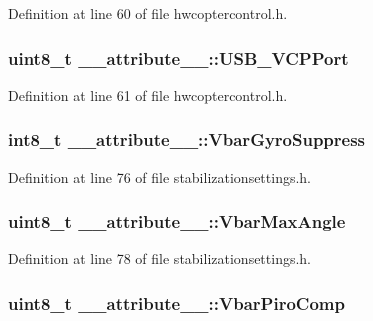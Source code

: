 \-Definition at line 60 of file hwcoptercontrol.\-h.

\hypertarget{struct____attribute_____a2e1a688d4f4b841b7f0a319d7922df49}{
\subsubsection[{\-U\-S\-B\-\_\-\-V\-C\-P\-Port}]{\setlength{\rightskip}{0pt plus 5cm}uint8\-\_\-t {\bf \-\_\-\-\_\-attribute\-\_\-\-\_\-\-::\-U\-S\-B\-\_\-\-V\-C\-P\-Port}}}\label{struct____attribute_____a2e1a688d4f4b841b7f0a319d7922df49}


\-Definition at line 61 of file hwcoptercontrol.\-h.

\hypertarget{struct____attribute_____ab6be6cd99e6b24918e3c84a0bed692b9}{
\subsubsection[{\-Vbar\-Gyro\-Suppress}]{\setlength{\rightskip}{0pt plus 5cm}int8\-\_\-t {\bf \-\_\-\-\_\-attribute\-\_\-\-\_\-\-::\-Vbar\-Gyro\-Suppress}}}\label{struct____attribute_____ab6be6cd99e6b24918e3c84a0bed692b9}


\-Definition at line 76 of file stabilizationsettings.\-h.

\hypertarget{struct____attribute_____a7ddd55c3e30354d5a155bb9f71a3df9f}{
\subsubsection[{\-Vbar\-Max\-Angle}]{\setlength{\rightskip}{0pt plus 5cm}uint8\-\_\-t {\bf \-\_\-\-\_\-attribute\-\_\-\-\_\-\-::\-Vbar\-Max\-Angle}}}\label{struct____attribute_____a7ddd55c3e30354d5a155bb9f71a3df9f}


\-Definition at line 78 of file stabilizationsettings.\-h.

\hypertarget{struct____attribute_____a4e50e7ded307e20fcedb9e93e48d3212}{
\subsubsection[{\-Vbar\-Piro\-Comp}]{\setlength{\rightskip}{0pt plus 5cm}uint8\-\_\-t {\bf \-\_\-\-\_\-attribute\-\_\-\-\_\-\-::\-Vbar\-Piro\-Comp}}}\label{struct____attribute_____a4e50e7ded307e20fcedb9e93e48d3212}


